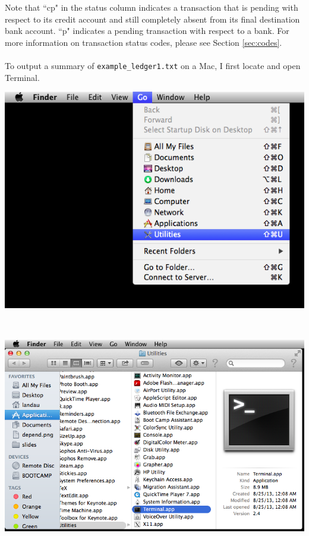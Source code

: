 \documentclass{article}
\providecommand{\q}{$\quad$ \newline}
\begin{document}
\begin{flushleft}
Note that ``cp" in the status column indicates a transaction that is pending with respect to its credit account and still completely absent from its final destination bank account. ``p" indicates a pending transaction with respect to a bank. For more information on transaction status codes, please see Section \ref{sec:codes}. 

\paragraph{} To output a summary of {\tt example\_ledger1.txt} on a Mac, I first locate and open Terminal. \q

\begin{center}
\includegraphics[scale=.75]{fig/open2.png}
\end{center} \q

\begin{center}
\includegraphics[scale=.6]{fig/open1.png}
\end{center} \q


\end{flushleft}
\end{document}
